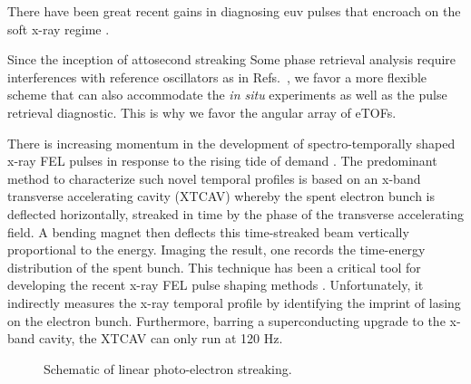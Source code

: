 There have been great recent gains in diagnosing euv pulses that encroach on the soft x-ray regime \cite{Biegert2016,WornerSci2017,Worner2017}.

Since the inception of attosecond streaking \cite{Zenghu2005,KellerAngularStreaking}
Some phase retrieval analysis require interferences with reference oscillators as in Refs.~\cite{Zenghu2010,Cocke2013}, we favor a more flexible scheme that can also accommodate the \textit{in situ} experiments as well as the pulse retrieval diagnostic.
This is why we favor the angular array of eTOFs.



There is increasing momentum in the development of spectro-temporally shaped x-ray FEL pulses \cite{eehg2009,Lutman13_twocolor,Marinelli13_twocolor,Allaria2014,Marinelli2015,Hemsing2016,Prince2016,Lutman2016,Marinelli2016} in response to the rising tide of demand \cite{Mukamel2007,Biggs2012,Mukamel2013,4WaveMixing,TIGER2015}.
The predominant method to characterize such novel temporal profiles is based on an x-band transverse accelerating cavity (XTCAV) \cite{xtcav2014} whereby the spent electron bunch is deflected horizontally, streaked in time by the phase of the transverse accelerating field.
A bending magnet then deflects this time-streaked beam vertically proportional to the energy.
Imaging the result, one records the time-energy distribution of the spent bunch.
This technique has been a critical tool for developing the recent x-ray FEL pulse shaping methods \cite{Marinelli2015,Marinelli2016}.
Unfortunately, it indirectly measures the x-ray temporal profile by identifying the imprint of lasing on the electron bunch.
Furthermore, barring a superconducting upgrade to the x-band cavity, the XTCAV can only run at 120 Hz.

\begin{wrapfigure}[18]{r}{7.5cm}
\vspace{-\baselineskip}
\centerline{
}
\vspace{-\baselineskip}
\caption{
	\label{streakingschematic} 
	Schematic of linear photo-electron streaking.
}
\end{wrapfigure}

